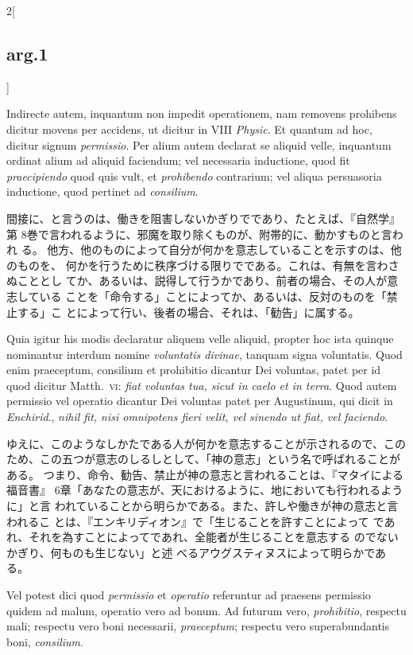 \documentclass[paper=a4paper,fontsize=10pt,jafontsize=9pt,titlepage]{jlreq}
\begin{document}
\begin{paracol}{2}[\subsection{arg.1}]
\switchcolumn*


Indirecte
autem, inquantum non impedit operationem, nam removens prohibens dicitur
movens per accidens, ut dicitur in VIII {\itshape Physic}. Et quantum ad hoc,
dicitur signum {\itshape permissio}. Per alium autem declarat se aliquid velle,
inquantum ordinat alium ad aliquid faciendum; vel necessaria inductione,
quod fit {\itshape praecipiendo} quod quis vult, et {\itshape prohibendo} contrarium; vel
aliqua persuasoria inductione, quod pertinet ad {\itshape consilium}.

\switchcolumn

間接に、と言うのは、働きを阻害しないかぎりでであり、たとえば、『自然学』第
 8巻で言われるように、邪魔を取り除くものが、附帯的に、動かすものと言われ
 る。
他方、他のものによって自分が何かを意志していることを示すのは、他のものを、
 何かを行うために秩序づける限りでである。これは、有無を言わさぬこととし
 てか、あるいは、説得して行うかであり、前者の場合、その人が意志している
 ことを「命令する」ことによってか、あるいは、反対のものを「禁止する」こ
 とによって行い、後者の場合、それは、「勧告」に属する。

\switchcolumn*


Quia igitur
his modis declaratur aliquem velle aliquid, propter hoc ista quinque
nominantur interdum nomine {\itshape voluntatis divinae}, tanquam signa
voluntatis. Quod enim praeceptum, consilium et prohibitio dicantur Dei
voluntas, patet per id quod dicitur Matth.~{\scshape vi}: {\itshape fiat voluntas tua, sicut
in caelo et in terra}. Quod autem permissio vel operatio dicantur Dei
voluntas patet per Augustinum, qui dicit in {\itshape Enchirid}., {\itshape nihil fit, nisi
omnipotens fieri velit, vel sinendo ut fiat, vel faciendo}.

\switchcolumn

ゆえに、このようなしかたである人が何かを意志することが示されるので、この
 ため、この五つが意志のしるしとして、「神の意志」という名で呼ばれることがある。
つまり、命令、勧告、禁止が神の意志と言われることは、『マタイによる福音書』
 6章「あなたの意志が、天におけるように、地においても行われるように」と言
 われていることから明らかである。また、許しや働きが神の意志と言われるこ
 とは、『エンキリディオン』で「生じることを許すことによって
 であれ、それを為すことによってであれ、全能者が生じることを意志する
 のでないかぎり、何ものも生じない」と述
 べるアウグスティヌスによって明らかである。

\switchcolumn*


Vel potest
dici quod {\itshape permissio} et {\itshape operatio} referuntur ad praesens permissio quidem
ad malum, operatio vero ad bonum. Ad futurum vero, {\itshape prohibitio}, respectu
mali; respectu vero boni necessarii, {\itshape praeceptum}; respectu vero
superabundantis boni, {\itshape consilium}.


\end{paracol}
\end{document}
